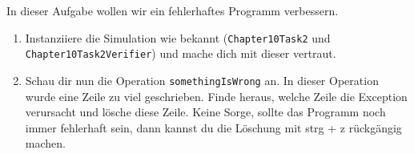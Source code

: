 

In dieser Aufgabe wollen wir ein fehlerhaftes Programm verbessern. 

\begin{enumerate}                           
    \item Instanziiere die Simulation wie bekannt (\lstinline{Chapter10Task2} und \lstinline{Chapter10Task2Verifier}) und mache dich mit dieser vertraut.
    \item Schau dir nun die Operation \lstinline{somethingIsWrong} an. In dieser Operation wurde eine Zeile zu viel geschrieben. Finde heraus, welche Zeile die Exception verursacht und lösche diese Zeile.
        Keine Sorge, sollte das Programm noch immer fehlerhaft sein, dann kannst du die Löschung mit strg + z rückgängig machen.
    
\end{enumerate}
